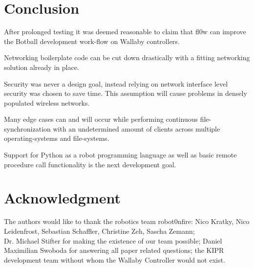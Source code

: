\documentclass[conference]{IEEEtran}
\begin{document}
\section{Conclusion}

After prolonged testing it was deemed reasonable to claim that fl0w\cite{fl0w:Philip Trauner} can improve the Botball development work-flow on Wallaby\cite{Wallaby Controller:KIPR} controllers.

Networking boilerplate code can be cut down drastically with a fitting networking solution already in place.

Security was never a design goal, instead relying on network interface level security was chosen to save time. This assumption will cause problems in densely populated wireless networks.

Many edge cases can and will occur while performing continuous file-synchronization with an undetermined amount of clients across multiple operating-systems and file-systems.

Support for Python\cite{Python:Python Foundation} as a robot programming language as well as basic remote procedure call functionality is the next development goal.

\section*{Acknowledgment}
The authors would like to thank the robotics team robot0nfire: Nico Kratky, Nico Leidenfrost, Sebastian Schaffler, Christine Zeh, Sascha Zemann;\\ Dr. Michael Stifter for making the existence of our team possible; Daniel Maximilian Swoboda for answering all paper related questions; the KIPR development team without whom the Wallaby\cite{Wallaby Controller:KIPR} Controller would not exist.
\end{document}
